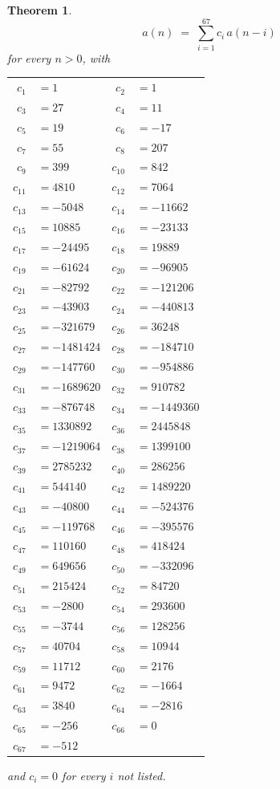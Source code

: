 \documentclass[11pt,a4paper]{article}
\theoremstyle{plain}
\newtheorem{theorem}{Theorem}
\theoremstyle{definition}
\begin{document}
\begin{theorem}
\[
a(n)\;=\;\sum_{i=1}^{67}c_i\,a(n-i)
\]
for every $n>0$, with
\begin{center}\footnotesize
\begin{tabular}{r@{\,}l@{\qquad}r@{\,}l}
$c_{1}$ & $=1$ & $c_{2}$ & $=1$ \\
$c_{3}$ & $=27$ & $c_{4}$ & $=11$ \\
$c_{5}$ & $=19$ & $c_{6}$ & $=-17$ \\
$c_{7}$ & $=55$ & $c_{8}$ & $=207$ \\
$c_{9}$ & $=399$ & $c_{10}$ & $=842$ \\
$c_{11}$ & $=4810$ & $c_{12}$ & $=7064$ \\
$c_{13}$ & $=-5048$ & $c_{14}$ & $=-11662$ \\
$c_{15}$ & $=10885$ & $c_{16}$ & $=-23133$ \\
$c_{17}$ & $=-24495$ & $c_{18}$ & $=19889$ \\
$c_{19}$ & $=-61624$ & $c_{20}$ & $=-96905$ \\
$c_{21}$ & $=-82792$ & $c_{22}$ & $=-121206$ \\
$c_{23}$ & $=-43903$ & $c_{24}$ & $=-440813$ \\
$c_{25}$ & $=-321679$ & $c_{26}$ & $=36248$ \\
$c_{27}$ & $=-1481424$ & $c_{28}$ & $=-184710$ \\
$c_{29}$ & $=-147760$ & $c_{30}$ & $=-954886$ \\
$c_{31}$ & $=-1689620$ & $c_{32}$ & $=910782$ \\
$c_{33}$ & $=-876748$ & $c_{34}$ & $=-1449360$ \\
$c_{35}$ & $=1330892$ & $c_{36}$ & $=2445848$ \\
$c_{37}$ & $=-1219064$ & $c_{38}$ & $=1399100$ \\
$c_{39}$ & $=2785232$ & $c_{40}$ & $=286256$ \\
$c_{41}$ & $=544140$ & $c_{42}$ & $=1489220$ \\
$c_{43}$ & $=-40800$ & $c_{44}$ & $=-524376$ \\
$c_{45}$ & $=-119768$ & $c_{46}$ & $=-395576$ \\
$c_{47}$ & $=110160$ & $c_{48}$ & $=418424$ \\
$c_{49}$ & $=649656$ & $c_{50}$ & $=-332096$ \\
$c_{51}$ & $=215424$ & $c_{52}$ & $=84720$ \\
$c_{53}$ & $=-2800$ & $c_{54}$ & $=293600$ \\
$c_{55}$ & $=-3744$ & $c_{56}$ & $=128256$ \\
$c_{57}$ & $=40704$ & $c_{58}$ & $=10944$ \\
$c_{59}$ & $=11712$ & $c_{60}$ & $=2176$ \\
$c_{61}$ & $=9472$ & $c_{62}$ & $=-1664$ \\
$c_{63}$ & $=3840$ & $c_{64}$ & $=-2816$ \\
$c_{65}$ & $=-256$ & $c_{66}$ & $=0$ \\
$c_{67}$ & $=-512$ \\
\end{tabular}
\end{center}
and $c_i=0$ for every $i$ not listed.
\end{theorem}
\end{document}
